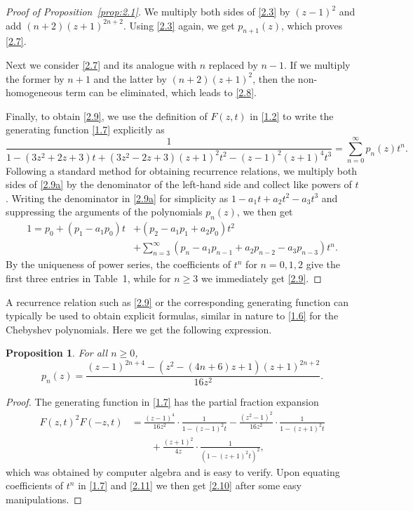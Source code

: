 \documentclass{amsart}
\theoremstyle{plain}
\newtheorem{proposition}[theorem]{Proposition}
\numberwithin{equation}{section}
\begin{document}
\begin{proof}[Proof of Proposition~\ref{prop:2.1}]
We multiply both sides of \eqref{2.3} by $(z-1)^2$ and add $(n+2)(z+1)^{2n+2}$.
Using \eqref{2.3} again, we get $p_{n+1}(z)$, which proves \eqref{2.7}.

Next we consider \eqref{2.7} and its analogue with $n$ replaced by $n-1$.
If we multiply the former by $n+1$ and the latter by $(n+2)(z+1)^2$, then the
non-homogeneous term can be eliminated, which leads to \eqref{2.8}.

Finally, to obtain \eqref{2.9}, we use the definition of $F(z,t)$ in \eqref{1.2}
to write the generating function \eqref{1.7} explicitly as
\begin{equation}\label{2.9a}
\frac{1}{1-(3z^2+2z+3)t+(3z^2-2z+3)(z+1)^2t^2-(z-1)^2(z+1)^4t^3}
=\sum_{n=0}^\infty p_n(z)t^n.
\end{equation}
Following a standard method for obtaining recurrence relations, we multiply
both sides of \eqref{2.9a} by the denominator of the left-hand side and 
collect like powers of $t$. Writing the denominator in \eqref{2.9a} for 
simplicity as $1-a_1t+a_2t^2-a_3t^3$ and suppressing the arguments of the
polynomials $p_n(z)$, we then get
\begin{align*}
1 = p_0+\left(p_1-a_1p_0\right)t&+\left(p_2-a_1p_1+a_2p_0\right)t^2\\
&+\sum_{n=3}^\infty\left(p_n-a_1p_{n-1}+a_2p_{n-2}-a_3p_{n-3}\right)t^n.
\end{align*}
By the uniqueness of power series, the coefficients of $t^n$ for $n=0,1,2$ give
the first three entries in Table~1, while for $n\geq 3$ we immediately 
get \eqref{2.9}.
\end{proof}

A recurrence relation such as \eqref{2.9} or the corresponding generating
function can typically be used to obtain explicit formulas, similar in
nature to \eqref{1.6} for the Chebyshev polynomials. Here we get the 
following expression.

\begin{proposition}\label{prop:2.2}
For all $n\geq 0$, 
\begin{equation}\label{2.10}
p_n(z)=\frac{(z-1)^{2n+4}-\left(z^2-(4n+6)z+1\right)(z+1)^{2n+2}}{16z^2}.
\end{equation}
\end{proposition}

\begin{proof}
The generating function in \eqref{1.7} has the partial fraction expansion
\begin{align}
F(z,t)^2F(-z,t)&=\frac{(z-1)^4}{16z^2}\cdot\frac{1}{1-(z-1)^2t}
-\frac{(z^2-1)^2}{16z^2}\cdot\frac{1}{1-(z+1)^2t}\label{2.11} \\
&\qquad+\frac{(z+1)^2}{4z}\cdot\frac{1}{(1-(z+1)^2t)^2},\nonumber
\end{align}
which was obtained by computer algebra and is easy to verify. Upon equating
coefficients of $t^n$ in \eqref{1.7} and \eqref{2.11} we then get 
\eqref{2.10} after some easy manipulations.
\end{proof}
\end{document}
